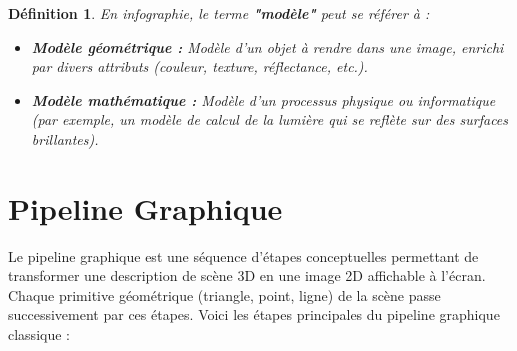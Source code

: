 \documentclass{article}
\newtheorem{definition}{Définition}
\begin{document}
\begin{definition}
En infographie, le terme \textbf{"modèle"} peut se référer à :
\begin{itemize}
    \item \textbf{Modèle géométrique :} Modèle d'un objet à rendre dans une image, enrichi par divers attributs (couleur, texture, réflectance, etc.).
    \item \textbf{Modèle mathématique :} Modèle d'un processus physique ou informatique (par exemple, un modèle de calcul de la lumière qui se reflète sur des surfaces brillantes).
\end{itemize}
\end{definition}
\section{Pipeline Graphique}
Le pipeline graphique est une séquence d'étapes conceptuelles permettant de transformer une description de scène 3D en une image 2D affichable à l'écran. Chaque primitive géométrique (triangle, point, ligne) de la scène passe successivement par ces étapes.
Voici les étapes principales du pipeline graphique classique :
\end{document}
